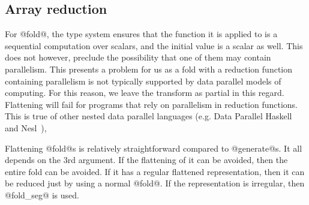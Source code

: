 \subsection{Array reduction}
For @fold@, the type system ensures that the function it is applied to is a sequential computation over scalars, and the initial value is a scalar as well. This does not however, preclude the possibility that one of them may contain parallelism. This presents a problem for us as a fold with a reduction function containing parallelism is not typically supported by data parallel models of computing. For this reason, we leave the transform as partial in this regard. Flattening will fail for programs that rely on parallelism in reduction functions. This is true of other nested data parallel languages (e.g. Data Parallel Haskell~\cite{Chakravarty:DPH} and Nesl~\cite{Blelloch:nesl1995}),

Flattening @fold@s is relatively straightforward compared to @generate@s. It all depends on the 3rd argument. If the flattening of it can be avoided, then the entire fold can be avoided. If it has a regular flattened representation, then it can be reduced just by using a normal @fold@. If the representation is irregular, then @fold_seg@ is used.



